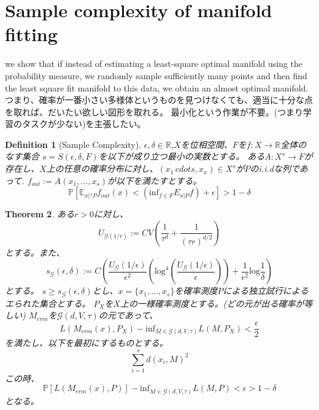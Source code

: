 \documentclass{ujarticle}
\newtheorem{thm}{Theorem}[section]
\newtheorem{dfn}[thm]{Definition}
\begin{document}
\section{Sample complexity of manifold fitting}
\label{Sample complexity of manifold fitting}

we show that if instead of estimating a least-square optimal manifold using the probability
measure, we randomly sample sufficiently many points and then find the least square fit manifold to this
data, we obtain an almost optimal manifold.
つまり、確率が一番小さい多様体というものを見つけなくても、適当に十分な点を取れば、だいたい欲しい図形を取れる。
最小化という作業が不要。(つまり学習のタスクが少ない)を主張したい。

\begin{dfn}[Sample Complexity]
$\epsilon, \delta \in \mathbb{R}$,$X$を位相空間、$F$を$f:X \to \mathbb{R}$全体のなす集合
$s=S(\epsilon,\delta,F)$を以下が成り立つ最小の実数とする。
ある$A:X^s \to F$が存在し、$X$上の任意の確率分布に対し、$(x_1\,cdots ,x_x) \in X^s$が$P$のi.i.dな列であって.
$f_{out}:= A(x_1,\dots,x_s)$が以下を満たすとする。
\begin{equation*}
 \mathbb{P}[\mathbb{E}_{x|?P}f_{out}(x) < (\mathrm{inf}_{f \in F}E_{x|P}f) + \epsilon ] > 1 - \delta
\end{equation*}

\end{dfn}

\begin{thm}
 ある$r > 0$に対し、
 \begin{equation*}
  U_{\mathcal{G}(1/r)}:=CV( \frac{ 1 }{ \tau^d } + \frac{ 1 }{ (\tau r)^{d/2} } )
 \end{equation*}
 とする。また、
 \begin{equation*}
  s_{\mathcal{G}}(\epsilon,\delta):=C(\frac{ U_{\mathcal{G}}(1/\epsilon) }{ \epsilon^2 }(\mathrm{log}^4
  (\frac{U_{\mathcal{G}}(1/\epsilon)}{\epsilon})) + \frac{ 1 }{ \epsilon^2 }\mathrm{log}\frac{ 1 }{ \delta }  )
 \end{equation*}
とする。
$s \ge s_{\mathcal{G}}(\epsilon,\delta)$とし、$x=\{ x_1,\dots,x_s\}$を確率測度$P$による独立試行によるエられた集合とする。
$P_X$を$X$上の一様確率測度とする。(どの元が出る確率が等しい)
$M_{erm}$を$\mathcal{G}(d,V,\tau)$の元であって、
\begin{equation*}
 L(M_{erm}(x),P_X) - \mathrm{inf}_{M \in \mathcal{G}(d,V,\tau)} L(M,P_X) < \frac{ \epsilon }{ 2 }
\end{equation*}
を満たし、以下を最初にするものとする。
\begin{equation*}
 \sum_{i=1}^sd(x_i,M)^2
\end{equation*}
この時、
\begin{equation*}
 \mathbb{P}[L(M_{erm}(x),P)] - \mathrm{inf}_{M \in \mathcal{G}(d,V,\tau)} L(M,P) < \epsilon > 1- \delta
\end{equation*}
となる。
\end{thm}
\end{document}
